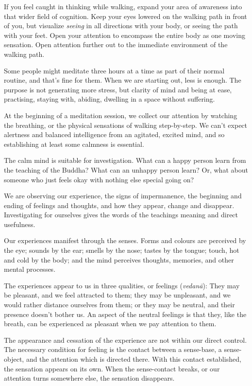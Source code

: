 If you feel caught in thinking while walking, expand your area of
awareness into that wider field of cognition. Keep your eyes lowered on
the walking path in front of you, but visualize \emph{seeing} in all
directions with your body, or seeing the path with your feet. Open your
attention to encompass the entire body as one moving sensation. Open
attention further out to the immediate environment of the walking path.

Some people might meditate three hours at a time as part of their normal
routine, and that's fine for them. When we are starting out, less is
enough. The purpose is not generating more stress, but clarity of mind
and being at ease, practising, staying with, abiding, dwelling in a
space without suffering.


At the beginning of a meditation session, we collect our attention by
watching the breathing, or the physical sensations of walking
step-by-step. We can't expect alertness and balanced intelligence from
an agitated, excited mind, and so establishing at least some calmness is
essential.

The calm mind is suitable for investigation. What can a happy person
learn from the teaching of the Buddha? What can an unhappy person learn?
Or, what about someone who just feels okay with nothing else special
going on?

We are observing our experience, the signs of impermanence, the
beginning and ending of feelings and thoughts, and how they appear,
change and disappear. Investigating for ourselves gives the words of the
teachings meaning and direct usefulness.

Our experiences manifest through the senses. Forms and colours are
perceived by the eye; sounds by the ear; smells by the nose; tastes by
the tongue; touch, hot and cold by the body; and the mind perceives
thoughts, memories, and other mental processes.


The experiences appear to us in three qualities, or feelings
(\emph{vedanā}): They may be pleasant, and we feel attracted to them;
they may be unpleasant, and we would rather distance ourselves from
them; or they may be neutral, and their presence doesn't bother us. An
aspect of the neutral feelings is that they, like the breath, can be
experienced as pleasant when we pay attention to them.

The appearance and cessation of the experience are not within our direct
control. The necessary condition for feeling is the contact between a
sense-base, a sense-object, and the attention which is directed there.
With this contact established, the sensation appears on its own. When
the sense-contact breaks, or our attention turns somewhere else, the
sensation disappears.

